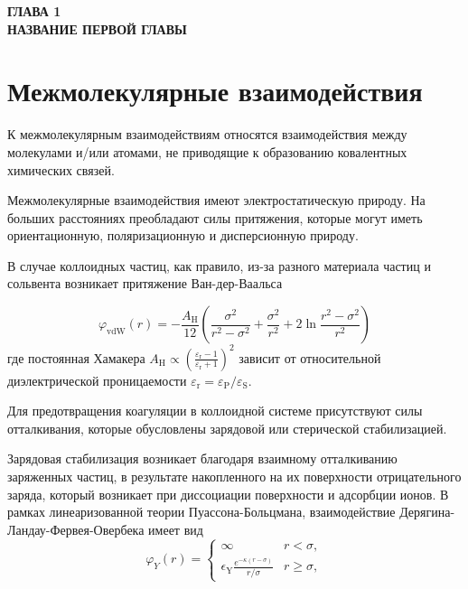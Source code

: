 
\newpage
\begin{center}
\textbf{ГЛАВА 1}\\
\textbf{НАЗВАНИЕ ПЕРВОЙ ГЛАВЫ}
\end{center}




\section{Межмолекулярные взаимодействия}\label{C1_1}

К межмолекулярным взаимодействиям относятся взаимодействия между молекулами и/или атомами, не приводящие к образованию ковалентных химических связей.

Межмолекулярные взаимодействия имеют электростатическую природу. На больших расстояниях преобладают силы притяжения, которые могут иметь ориентационную, поляризационную и дисперсионную природу.

В случае коллоидных частиц, как правило, из-за разного материала частиц и сольвента возникает притяжение Ван-дер-Ваальса \cite{Yur31, Yur53}

\begin{equation}
\varphi_{\mathrm{vdW}}(r)=-\frac{A_{\mathrm{H}}}{12}\left(\frac{\sigma^{2}}{r^{2}-\sigma^{2}}+\frac{\sigma^{2}}{r^{2}}+2 \ln \frac{r^{2}-\sigma^{2}}{r^{2}}\right)
\end{equation}
где постоянная Хамакера $A_{\mathrm{H}} \propto\left(\frac{\varepsilon_{\mathrm{r}}-1}{\varepsilon_{\mathrm{r}}+1}\right)^{2}$ зависит от относительной диэлектрической проницаемости $\varepsilon_{\mathrm{r}}=\varepsilon_{\mathrm{P}} / \varepsilon_{\mathrm{S}}$. 

Для предотвращения коагуляции в коллоидной системе присутствуют силы отталкивания, которые обусловлены зарядовой или стерической стабилизацией.

Зарядовая стабилизация возникает благодаря взаимному отталкиванию заряженных частиц, в результате накопленного на их поверхности отрицательного заряда, который возникает при диссоциации поверхности и адсорбции ионов. 
В рамках линеаризованной теории Пуассона-Больцмана, взаимодействие Дерягина-Ландау-Фервея-Овербека имеет вид \cite{Yur54}
\begin{equation}
\varphi_{Y}(r)=\left\{\begin{array}{ll}
\infty & r<\sigma, \\
\epsilon_{\mathrm{Y}} \frac{e^{-\kappa(r-\sigma)}}{r / \sigma} & r \geq \sigma,
\end{array}\right.
\end{equation}

